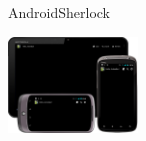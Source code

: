 \documentclass[aspectratio=169]{beamer}
\newcommand{\surl}[1] {{\tiny \url{#1}}}
\begin{document}
% 

    \begin{frame}{AndroidSherlock}
      \begin{center}
      \includegraphics[height=1.0in]{androidsherlock.png}
      \end{center}
    \end{frame}
\end{document}
